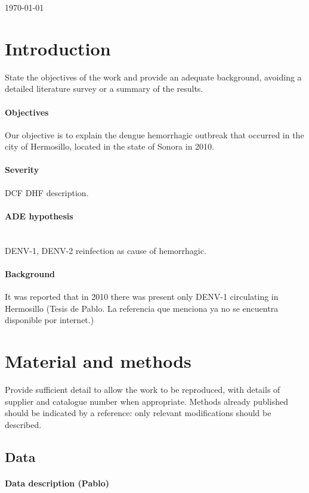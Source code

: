 \documentclass[5p, authoryear, final, sort&compress, times]{elsarticle}
\begin{document}
	\begin{frontmatter}
		
	\end{frontmatter}
	\today
    \section{Introduction} \label{intro}
		State the objectives of the work and provide an adequate 
		background, avoiding a detailed literature survey or a 
		summary of the results.

		\paragraph{Objectives}
        Our objective is to explain the dengue hemorrhagic outbreak that 
     occurred in the city of Hermosillo, located in the state of Sonora in 2010.
    \paragraph{Severity}
    \ac{DCF} 
    \ac{DHF} description.
    \paragraph{ADE hypothesis}
     \\
     \ac{DENV-1}, \ac{DENV-2}
     reinfection as cause of hemorrhagic.
		\paragraph{Background}
        It was reported that in 2010 there was present only DENV-1 circulating in Hermosillo (Tesis de Pablo. La referencia que menciona ya no se encuentra disponible por internet.) 
	\section{Material and methods}
		Provide sufficient detail to allow the work to be 
		reproduced, with details of supplier and catalogue 
		number when appropriate. Methods already published 
		should be indicated by a reference: only relevant 
		modifications should be described.
		\subsection{Data}
		    \label{sec:Intro}
			\paragraph{Data description (Pablo)}
\end{document}
